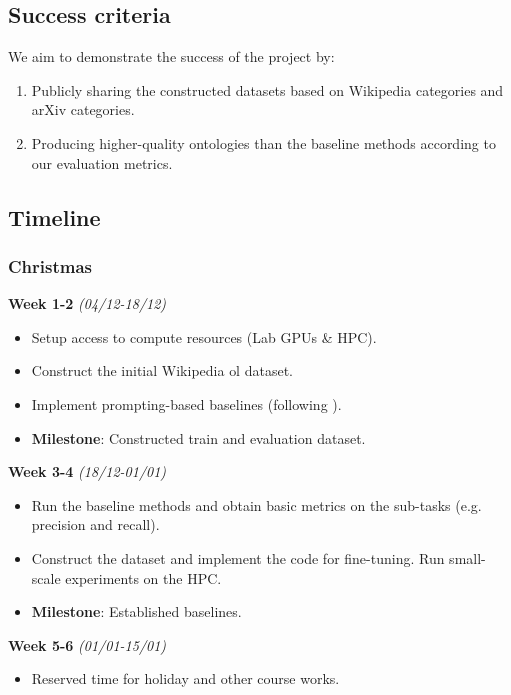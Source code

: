 \subsection*{Success criteria}

We aim to demonstrate the success of the project by:
\begin{enumerate}
    \item Publicly sharing the constructed datasets based on Wikipedia categories and arXiv categories.
    \item Producing higher-quality ontologies than the baseline methods according to our evaluation metrics.
\end{enumerate}

\subsection*{Timeline}

\subsubsection*{Christmas}
\textbf{Week 1-2} \emph{(04/12-18/12)}
\begin{itemize}
    \item Setup access to compute resources (Lab GPUs \& HPC).
    \item Construct the initial Wikipedia \gls{ol} dataset.
    \item Implement prompting-based baselines (following \citet{llms4ol}).
    \item \textbf{Milestone}: Constructed train and evaluation dataset.
\end{itemize}

\textbf{Week 3-4} \emph{(18/12-01/01)}
\begin{itemize}
    \item Run the baseline methods and obtain basic metrics on the sub-tasks (e.g. precision and recall).
    \item Construct the dataset and implement the code for fine-tuning. Run small-scale experiments on the HPC.
    \item \textbf{Milestone}: Established baselines.
\end{itemize}

\textbf{Week 5-6} \emph{(01/01-15/01)}
\begin{itemize}
    \item Reserved time for holiday and other course works.
\end{itemize}

